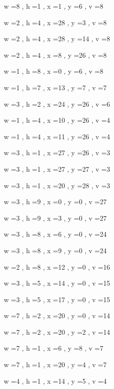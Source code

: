 \documentclass[11pt]{article}
\begin{document}
\par
w =8 , h =1 , x =1 , y =6 , v =8
\par
w =2 , h =4 , x =28 , y =3 , v =8
\par
w =2 , h =4 , x =28 , y =14 , v =8
\par
w =2 , h =4 , x =8 , y =26 , v =8
\par
w =1 , h =8 , x =0 , y =6 , v =8
\par
w =1 , h =7 , x =13 , y =7 , v =7
\par
w =3 , h =2 , x =24 , y =26 , v =6
\par
w =1 , h =4 , x =10 , y =26 , v =4
\par
w =1 , h =4 , x =11 , y =26 , v =4
\par
w =3 , h =1 , x =27 , y =26 , v =3
\par
w =3 , h =1 , x =27 , y =27 , v =3
\par
w =3 , h =1 , x =20 , y =28 , v =3
\par
\newpage




w =3 , h =9 , x =0 , y =0 , v =27
\par
w =3 , h =9 , x =3 , y =0 , v =27
\par
w =3 , h =8 , x =6 , y =0 , v =24
\par
w =3 , h =8 , x =9 , y =0 , v =24
\par
w =2 , h =8 , x =12 , y =0 , v =16
\par
w =3 , h =5 , x =14 , y =0 , v =15
\par
w =3 , h =5 , x =17 , y =0 , v =15
\par
w =7 , h =2 , x =20 , y =0 , v =14
\par
w =7 , h =2 , x =20 , y =2 , v =14
\par
w =7 , h =1 , x =6 , y =8 , v =7
\par
w =7 , h =1 , x =20 , y =4 , v =7
\par
w =4 , h =1 , x =14 , y =5 , v =4
\par
\newpage
\end{document}
